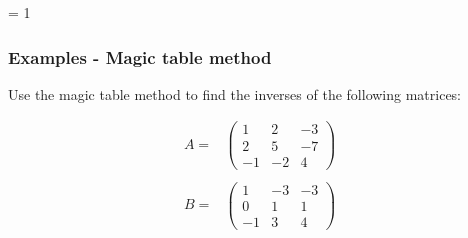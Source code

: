 \documentclass[usenames,dvipsnames,aspectratio=169,10pt]{beamer}
\def \EXAMPLEVERSION {3} %
\numberwithin{equation}{section}
\begin{document}
\ifnum \EXAMPLEVERSION = 1
\begin{frame}
\frametitle{Examples - Magic table method}

Use the magic table method to find the inverses of the following matrices:

\begin{align*}
A =& 
\begin{pmatrix}
  1 &  2 & -3 \\
  2 &  5 & -7 \\
 -1 & -2 &  4
\end{pmatrix}
\\ \\
B =& 
\begin{pmatrix}
  1 & -3 & -3 \\
  0 &  1 &  1 \\
 -1 &  3 &  4
\end{pmatrix}
\end{align*}

\end{frame}
\end{document}
